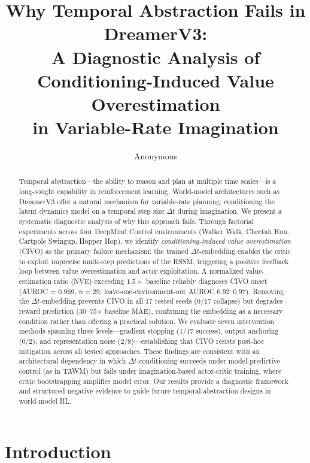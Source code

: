 \documentclass[10pt,letterpaper]{article}
\title{Why Temporal Abstraction Fails in DreamerV3:\\A Diagnostic Analysis of Conditioning-Induced Value Overestimation\\in Variable-Rate Imagination}
\author{Anonymous}
\date{}
\newcommand{\dt}{\Delta t}
\begin{document}
\maketitle

\begin{abstract}
Temporal abstraction---the ability to reason and plan at multiple time scales---is a long-sought capability in reinforcement learning. World-model architectures such as DreamerV3 offer a natural mechanism for variable-rate planning: conditioning the latent dynamics model on a temporal step size $\dt$ during imagination. We present a systematic diagnostic analysis of why this approach fails. Through factorial experiments across four DeepMind Control environments (Walker Walk, Cheetah Run, Cartpole Swingup, Hopper Hop), we identify \emph{conditioning-induced value overestimation} (CIVO) as the primary failure mechanism: the trained $\dt$-embedding enables the critic to exploit imprecise multi-step predictions of the RSSM, triggering a positive feedback loop between value overestimation and actor exploitation. A normalized value-estimation ratio (NVE) exceeding $1.5\times$ baseline reliably diagnoses CIVO onset (AUROC = 0.969, $n=29$; leave-one-environment-out AUROC 0.92--0.97). Removing the $\dt$-embedding prevents CIVO in all 17 tested seeds (0/17 collapse) but degrades reward prediction (30--75$\times$ baseline MAE), confirming the embedding as a necessary condition rather than offering a practical solution. We evaluate seven intervention methods spanning three levels---gradient stopping (1/17 success), output anchoring (0/2), and representation noise (2/8)---establishing that CIVO resists post-hoc mitigation across all tested approaches. These findings are consistent with an architectural dependency in which $\dt$-conditioning succeeds under model-predictive control (as in TAWM) but fails under imagination-based actor-critic training, where critic bootstrapping amplifies model error. Our results provide a diagnostic framework and structured negative evidence to guide future temporal-abstraction designs in world-model RL.
\end{abstract}

\section{Introduction}
\label{sec:intro}
\end{document}
